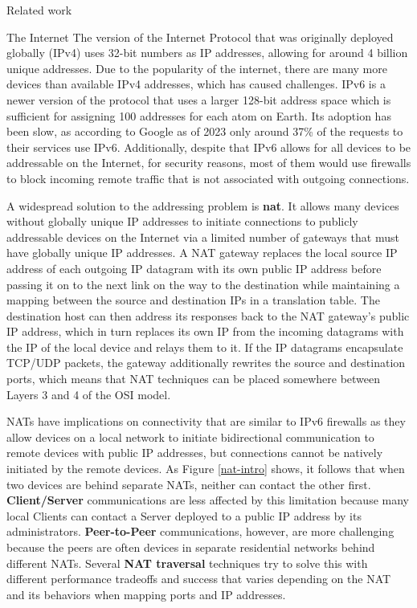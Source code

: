 \begin{frame}[fragile]{Related work}
\begin{block}{The Internet}
The version of the Internet Protocol that was originally deployed
globally (IPv4) uses 32-bit numbers as IP addresses, allowing for around
4 billion unique addresses. Due to the popularity of the internet, there
are many more devices than available IPv4 addresses, which has caused
challenges. IPv6 is a newer version of the protocol that uses a larger
128-bit address space which is sufficient for assigning 100 addresses
for each atom on Earth. Its adoption has been slow, as according to
Google as of 2023 only around 37\% of the requests to their services use
IPv6. Additionally, despite that IPv6 allows for all devices to be
addressable on the Internet, for security reasons, most of them would
use firewalls to block incoming remote traffic that is not associated
with outgoing connections.

A widespread solution to the addressing problem is \textbf{\gls{nat}}.
It allows many devices without globally unique IP addresses to initiate
connections to publicly addressable devices on the Internet via a
limited number of gateways that must have globally unique IP addresses.
A NAT gateway replaces the local source IP address of each outgoing IP
datagram with its own public IP address before passing it on to the next
link on the way to the destination while maintaining a mapping between
the source and destination IPs in a translation table. The destination
host can then address its responses back to the NAT gateway's public IP
address, which in turn replaces its own IP from the incoming datagrams
with the IP of the local device and relays them to it. If the IP
datagrams encapsulate TCP/UDP packets, the gateway additionally rewrites
the source and destination ports, which means that NAT techniques can be
placed somewhere between Layers 3 and 4 of the OSI model.

NATs have implications on connectivity that are similar to IPv6
firewalls as they allow devices on a local network to initiate
bidirectional communication to remote devices with public IP addresses,
but connections cannot be natively initiated by the remote devices. As
Figure \ref{nat-intro} shows, it follows that when two devices are
behind separate NATs, neither can contact the other first.
\textbf{Client/Server} communications are less affected by this
limitation because many local Clients can contact a Server deployed to a
public IP address by its administrators. \textbf{Peer-to-Peer}
communications, however, are more challenging because the peers are
often devices in separate residential networks behind different NATs.
Several \textbf{NAT traversal} techniques try to solve this with
different performance tradeoffs and success that varies depending on the
NAT \autocite{natBehaviorRFC} and its behaviors when mapping ports and
IP addresses.


\end{block}
\end{frame}
